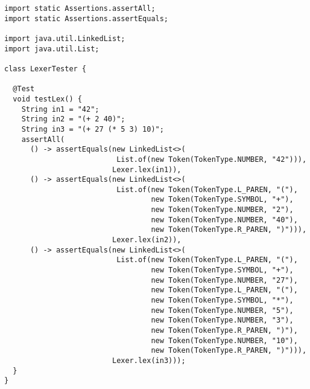 \newpage %
\begin{lstlisting}[language=MyJava]
import static Assertions.assertAll;
import static Assertions.assertEquals;

import java.util.LinkedList;
import java.util.List;

class LexerTester {
  
  @Test
  void testLex() {
    String in1 = "42";
    String in2 = "(+ 2 40)";
    String in3 = "(+ 27 (* 5 3) 10)";
    assertAll(
      () -> assertEquals(new LinkedList<>(
                          List.of(new Token(TokenType.NUMBER, "42"))),
                         Lexer.lex(in1)),
      () -> assertEquals(new LinkedList<>(
                          List.of(new Token(TokenType.L_PAREN, "("),
                                  new Token(TokenType.SYMBOL, "+"),
                                  new Token(TokenType.NUMBER, "2"),
                                  new Token(TokenType.NUMBER, "40"),
                                  new Token(TokenType.R_PAREN, ")"))),
                         Lexer.lex(in2)),
      () -> assertEquals(new LinkedList<>(
                          List.of(new Token(TokenType.L_PAREN, "("),
                                  new Token(TokenType.SYMBOL, "+"),
                                  new Token(TokenType.NUMBER, "27"),
                                  new Token(TokenType.L_PAREN, "("),
                                  new Token(TokenType.SYMBOL, "*"),
                                  new Token(TokenType.NUMBER, "5"),
                                  new Token(TokenType.NUMBER, "3"),
                                  new Token(TokenType.R_PAREN, ")"),
                                  new Token(TokenType.NUMBER, "10"),
                                  new Token(TokenType.R_PAREN, ")"))),
                         Lexer.lex(in3)));
  }
}
\end{lstlisting}

